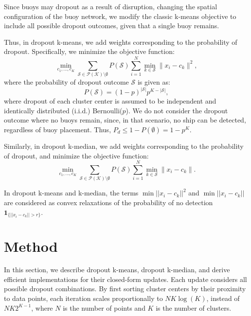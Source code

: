 \documentclass{article}
\begin{document}
Since buoys may dropout as a result of disruption, changing the spatial configuration of the buoy network, we modify the classic k-means objective to include all possible dropout outcomes, given that a single buoy remains.

Thus, in dropout k-means, we add weights corresponding to the probability of dropout. Specifically, we minimize the objective function:
\begin{equation}
    \min_{c_1,\dots,c_K} \sum_{\mathcal{S}\in\mathcal{P}(\mathcal{K})\setminus\emptyset} P(\mathcal{S}) \sum_{i=1}^N \min_{k\in \mathcal{S}} \|x_i-c_k\|^2,
    \label{eqn:dkmeans_obj}
\end{equation}
where the probability of dropout outcome $\mathcal{S}$ is given as:
\begin{equation}
    P(\mathcal{S})=(1-p)^{|\mathcal{S}|}p^{K-|\mathcal{S}|},
\end{equation}
where dropout of each cluster center is assumed to be independent and identically distributed (i.i.d.) Bernoulli($p$). We do not consider the dropout outcome where no buoys remain, since, in that scenario, no ship can be detected, regardless of buoy placement. Thus, $P_d\leq1-P(\emptyset)=1-p^K$. 

Similarly, in dropout k-median, we add weights corresponding to the probability of dropout, and minimize the objective function:
\begin{equation}
    \min_{c_1,\dots,c_K} \sum_{\mathcal{S}\in\mathcal{P}(\mathcal{K})\setminus\emptyset} P(\mathcal{S}) \sum_{i=1}^N \min_{k\in \mathcal{S}} \|x_i-c_k\|.
    \label{eqn:dkmedian_obj}
\end{equation}

In dropout k-means and k-median, the terms $\min ||x_i-c_k||^2$ and $\min ||x_i-c_k||$ are considered as convex relaxations of the probability of no detection $\mathbf{1}_{\{ ||x_i-c_k||> r\}}$.

\section{Method}\label{S:method}

In this section, we describe dropout k-means, dropout k-median, and derive efficient implementations for their closed-form updates. Each update considers all possible dropout combinations. By first sorting cluster centers by their proximity to data points, each iteration scales proportionally to $NK\log(K)$, instead of $NK2^{K-1}$, where $N$ is the number of points and $K$ is the number of clusters. 
\end{document}
